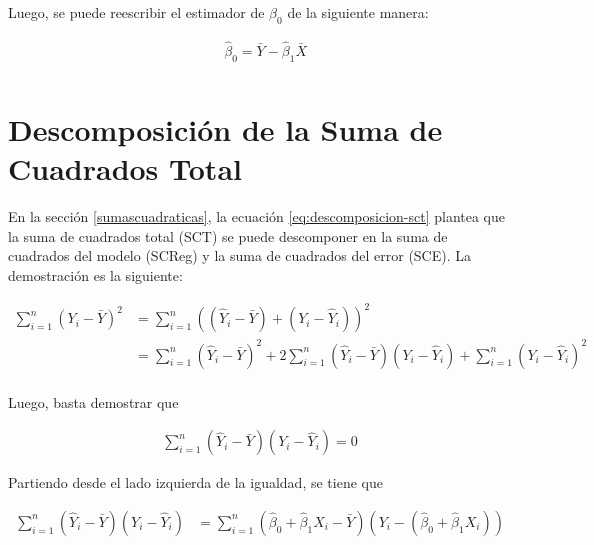 \documentclass[
  11pt,
]{book}
\theoremstyle{definition}
\theoremstyle{definition}
\theoremstyle{definition}
\theoremstyle{definition}
\theoremstyle{remark}
\begin{document}
Luego, se puede reescribir el estimador de \(\beta_0\) de la siguiente manera:

\begin{equation}
\begin{split}
&\widehat{\beta}_0 = \bar{Y} - \widehat{\beta}_1\bar{X} \\
\end{split}
\label{eq:beta0estimador-demostracion3}
\end{equation}

\section{Descomposición de la Suma de Cuadrados Total}\label{descomposiciuxf3n-de-la-suma-de-cuadrados-total}

En la sección \ref{sumascuadraticas}, la ecuación \eqref{eq:descomposicion-sct} plantea que la suma de cuadrados total (SCT) se puede descomponer en la suma de cuadrados del modelo (SCReg) y la suma de cuadrados del error (SCE). La demostración es la siguiente:

\begin{equation}
\begin{split}
\sum_{i=1}^n\left( Y_i - \bar{Y} \right)^2 &= \sum_{i=1}^n\left( \left( \widehat{Y}_i - \bar{Y} \right) + \left( Y_i - \widehat{Y}_i \right) \right)^2\\
&= \sum_{i=1}^n\left( \widehat{Y}_i - \bar{Y} \right)^2  + 2\sum_{i=1}^n\left( \widehat{Y}_i - \bar{Y} \right)\left( Y_i - \widehat{Y}_i \right) + \sum_{i=1}^n\left( Y_i - \widehat{Y}_i \right)^2\\
\end{split}
\label{eq:demostracionSCT1}
\end{equation}

Luego, basta demostrar que

\begin{equation}
\begin{split}
\sum_{i=1}^n\left( \widehat{Y}_i - \bar{Y} \right)\left( Y_i - \widehat{Y}_i \right) = 0
\end{split}
\label{eq:demostracionSCT2}
\end{equation}

Partiendo desde el lado izquierda de la igualdad, se tiene que

\begin{equation}
\begin{split}
\sum_{i=1}^n\left( \widehat{Y}_i - \bar{Y} \right)\left( Y_i - \widehat{Y}_i \right) &= \sum_{i=1}^n\left( \widehat{\beta}_0 + \widehat{\beta}_1X_i - \bar{Y} \right)\left( Y_i - \left( \widehat{\beta}_0 + \widehat{\beta}_1X_i \right) \right)\\
\end{split}
\label{eq:demostracionSCT3}
\end{equation}
\end{document}
